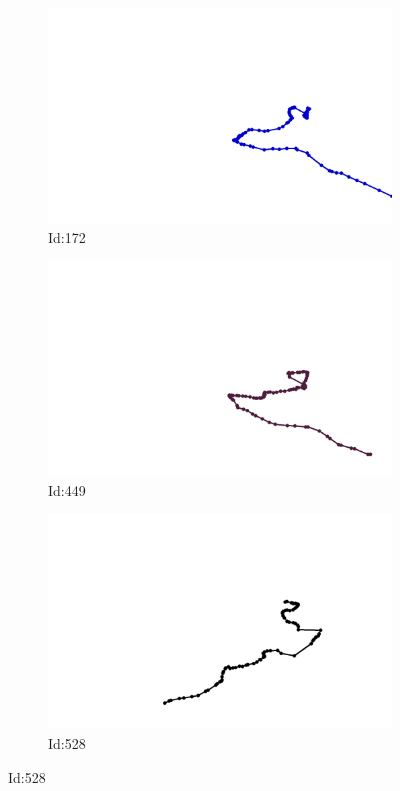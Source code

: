 \documentclass[12pt,twoside]{report}
\begin{document}
\begin{figure}
\centering
\begin{subfigure}[b]{0.20\textwidth}
\centering
\includegraphics[width=\textwidth]{../../trajectories/172.png}
\caption{Id:172}
\end{subfigure}
\begin{subfigure}[b]{0.20\textwidth}
\centering
\includegraphics[width=\textwidth]{../../trajectories/449.png}
\caption{Id:449}
\end{subfigure}
\begin{subfigure}[b]{0.20\textwidth}
\centering
\includegraphics[width=\textwidth]{../../trajectories/528.png}
\caption{Id:528}
\end{subfigure}
\end{figure}
\end{document}
